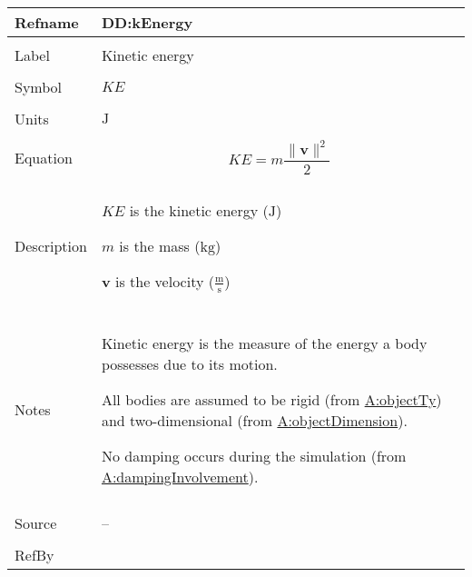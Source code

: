 \documentclass[12pt]{article}
\begin{document}
\vspace{\baselineskip}
\noindent
\begin{minipage}{\textwidth}
\begin{tabular}{>{\raggedright}p{}>{\raggedright\arraybackslash}p{}}
\toprule \textbf{Refname} & \textbf{DD:kEnergy}
\label{DD:kEnergy}
\\ \midrule \\
Label & Kinetic energy
        
\\ \midrule \\
Symbol & $KE$
         
\\ \midrule \\
Units & ${\text{J}}$
        
\\ \midrule \\
Equation & \begin{displaymath}
           KE=m \frac{\|\symbf{v}\|^{2}}{2}
           \end{displaymath}
\\ \midrule \\
Description & \begin{symbDescription}
              \item{$KE$ is the kinetic energy (${\text{J}}$)}
              \item{$m$ is the mass (${\text{kg}}$)}
              \item{$\symbf{v}$ is the velocity ($\frac{\text{m}}{\text{s}}$)}
              \end{symbDescription}
\\ \midrule \\
Notes & Kinetic energy is the measure of the energy a body possesses due to its motion.
        
        All bodies are assumed to be rigid (from \hyperref[assumpOT]{A:objectTy}) and two-dimensional (from \hyperref[assumpOD]{A:objectDimension}).
        
        No damping occurs during the simulation (from \hyperref[assumpDI]{A:dampingInvolvement}).
        
\\ \midrule \\
Source & --
         
\\ \midrule \\
RefBy & 
\\ \bottomrule
\end{tabular}
\end{minipage}
\end{document}
